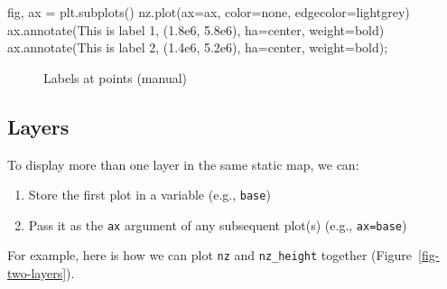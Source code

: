 \documentclass[
  letterpaper,
]{krantz}
\newenvironment{Shaded}{\begin{snugshade}}{\end{snugshade}}
\newcommand{\FloatTok}[1]{\textcolor[rgb]{0.68,0.00,0.00}{#1}}
\newcommand{\NormalTok}[1]{\textcolor[rgb]{0.00,0.23,0.31}{#1}}
\newcommand{\OperatorTok}[1]{\textcolor[rgb]{0.37,0.37,0.37}{#1}}
\newcommand{\StringTok}[1]{\textcolor[rgb]{0.13,0.47,0.30}{#1}}
\providecommand{\tightlist}{%
  \setlength{\itemsep}{0pt}\setlength{\parskip}{0pt}}\usepackage{longtable,booktabs,array}
\begin{document}
\begin{Shaded}
\begin{Highlighting}[]
\NormalTok{fig, ax }\OperatorTok{=}\NormalTok{ plt.subplots()}
\NormalTok{nz.plot(ax}\OperatorTok{=}\NormalTok{ax, color}\OperatorTok{=}\StringTok{\textquotesingle{}none\textquotesingle{}}\NormalTok{, edgecolor}\OperatorTok{=}\StringTok{\textquotesingle{}lightgrey\textquotesingle{}}\NormalTok{)}
\NormalTok{ax.annotate(}\StringTok{\textquotesingle{}This is label 1\textquotesingle{}}\NormalTok{, (}\FloatTok{1.8e6}\NormalTok{, }\FloatTok{5.8e6}\NormalTok{), ha}\OperatorTok{=}\StringTok{\textquotesingle{}center\textquotesingle{}}\NormalTok{, weight}\OperatorTok{=}\StringTok{\textquotesingle{}bold\textquotesingle{}}\NormalTok{)}
\NormalTok{ax.annotate(}\StringTok{\textquotesingle{}This is label 2\textquotesingle{}}\NormalTok{, (}\FloatTok{1.4e6}\NormalTok{, }\FloatTok{5.2e6}\NormalTok{), ha}\OperatorTok{=}\StringTok{\textquotesingle{}center\textquotesingle{}}\NormalTok{, weight}\OperatorTok{=}\StringTok{\textquotesingle{}bold\textquotesingle{}}\NormalTok{)}\OperatorTok{;}
\end{Highlighting}
\end{Shaded}

\begin{figure}[H]


\caption{\label{fig-labels-points2}Labels at points (manual)}

\end{figure}%

\subsection{Layers}\label{sec-plot-static-layers}

To display more than one layer in the same static map, we can:

\begin{enumerate}
\def\labelenumi{\arabic{enumi}.}
\tightlist
\item
  Store the first plot in a variable (e.g., \texttt{base})
\item
  Pass it as the \texttt{ax} argument of any subsequent plot(s) (e.g.,
  \texttt{ax=base})
\end{enumerate}

For example, here is how we can plot \texttt{nz} and \texttt{nz\_height}
together (Figure~\ref{fig-two-layers}).
\end{document}
